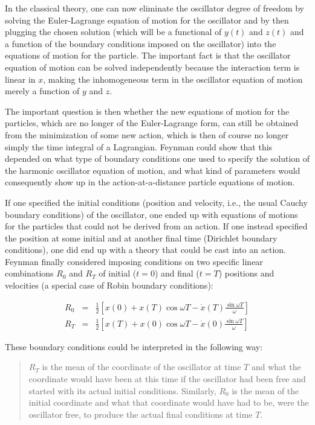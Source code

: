 \documentclass[12pt]{article}
\begin{document}
In the classical theory, one can now eliminate the oscillator degree of freedom by solving the Euler-Lagrange equation of motion for the oscillator and by then plugging the chosen solution (which will be a functional of $y(t)$ and $z(t)$ and a function of the boundary conditions imposed on the oscillator) into the equations of motion for the particle. The important fact is that the oscillator equation of motion can be solved independently because the interaction term is linear in $x$, making the inhomogeneous term in the oscillator equation of motion merely a function of $y$ and $z$.

The important question is then whether the new equations of motion for the particles, which are no longer of the Euler-Lagrange form, can still be obtained from the minimization of some new action, which is then of course no longer simply the time integral of a Lagrangian. Feynman could show that this depended on what type of boundary conditions one used to specify the solution of the harmonic oscillator equation of motion, and what kind of parameters would consequently show up in the action-at-a-distance particle equations of motion.

If one specified the initial conditions (position and velocity, i.e., the usual Cauchy boundary conditions) of the oscillator, one ended up with equations of motions for the particles that could not be derived from an action. If one instead specified the position at some initial and at another final time (Dirichlet boundary conditions), one did end up with a theory that could be cast into an action. Feynman finally considered imposing conditions on two specific linear combinations $R_0$ and $R_T$ of initial ($t=0$) and final ($t=T$) positions and velocities (a special case of Robin boundary conditions):

\begin{eqnarray}
R_0 & = & \frac{1}{2} \left[ x(0) + x(T) \cos{\omega T} - \dot{x} (T) \frac{\sin{\omega T}}{\omega} \right] \nonumber\\
R_T & = & \frac{1}{2} \left[ x(T) + x(0) \cos{\omega T} - \dot{x} (0) \frac{\sin{\omega T}}{\omega} \right]
\end{eqnarray} 

These boundary conditions could be interpreted in the following way:

\begin{quote}
$R_T$ is the mean of the coordinate of the oscillator at time $T$ and what the coordinate would have been at this time if the oscillator had been free and started with its actual initial conditions. Similarly, $R_0$ is the mean of the initial coordinate and what that coordinate would have had to be, were the oscillator free, to produce the actual final conditions at time $T$.
\end{quote}
\end{document}
